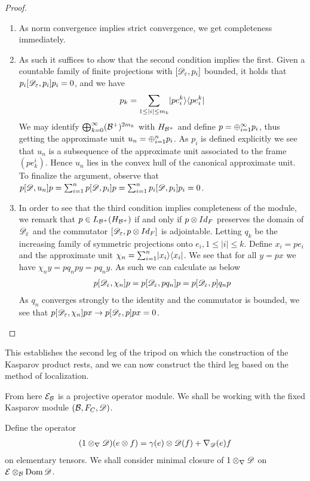 \begin{proof}
\begin{enumerate}
	\item As norm convergence implies strict convergence, we get completeness immediately. 
	\item As such it suffices to show that the second condition implies the first. 
	Given a countable family of finite projections with $[\mathscr{D}_\varepsilon,p_i]$ bounded, it holds that $p_i[\mathscr{D}_\varepsilon,p_i]p_i=0$, and we have
	\begin{align*}
		p_k=\sum_{1\leq |i|\leq m_k} \lvert pe_i^k \rangle\langle pe_i^k \rvert
	\end{align*}
	We may identify $\bigoplus_{k=0}^\infty (\mathcal{B}^+)^{2m_k}$ with $H_{\mathcal{B}^+}$ and define $p=\oplus_{i=1}^\infty p_i$, thus getting the approximate unit $u_n=\oplus_{i=1}^n p_i$. As $p_i$ is defined explicitly we see that $u_n$ is a subsequence of the approximate unit associated to the frame $(pe_k^i)$. Hence $u_n$ lies in the convex hull of the canonical approximate unit.  
	To finalize the argument, observe that $p[\mathscr{D},u_n]p=\sum_{i=1}^n p[\mathscr{D},p_i]p=\sum_{i=1}^n p_i [\mathscr{D},p_i]p_i=0$. 
	\item In order to see that the third condition implies completeness of the module, we remark that $p\in L_{\mathcal{B}^+}(H_{\mathcal{B}^+})$ if and only if $p \otimes Id_F$ preserves the domain of $\mathscr{D}_\varepsilon$ and the commutator $[\mathscr{D}_\varepsilon, p\otimes Id_F]$ is adjointable.
	Letting $q_k$ be the increasing family of symmetric projections onto $e_i,1\leq |i|\leq k$. Define $x_i=pe_i$ and the approximate unit $\chi_n=\sum_{i=1}^n \lvert x_i \rangle\langle x_i \rvert$. 
	We see that for all $y=px$ we have $\chi_n y=pq_npy=pq_n y$. As such we can calculate as below
	\begin{align*}
		p[\mathscr{D}_\varepsilon,\chi_n]p=p[\mathscr{D}_\varepsilon,pq_n]p=p[\mathscr{D}_\varepsilon,p]q_np
	\end{align*}
	As $q_n$ converges strongly to the identity and the commutator is bounded, we see that $p[\mathscr{D}_\varepsilon,\chi_n]p x\to p[\mathscr{D}_\varepsilon,p]px=0$. 
	\end{enumerate}
\end{proof}
This establishes the second leg of the tripod on which the construction of the Kasparov product rests, and we can now construct the third leg based on the method of localization.
\begin{assumption}
	From here $\mathcal{E}_{\mathcal{B}}$ is a projective operator module. We shall be working with the fixed Kasparov module $(\mathcal{B},F_C,\mathscr{D})$. 
\end{assumption}
\begin{definition}
	Define the operator 
	\begin{align*}
		(1\otimes_\nabla \mathscr{D})(e\otimes f)=\gamma(e)\otimes \mathscr{D}(f)+\nabla_{\mathscr{D}}(e)f
	\end{align*}
	on elementary tensors. We shall consider minimal closure of $1\otimes_\nabla \mathscr{D}$ on $\mathcal{E}\otimes_{\mathcal{B}} \operatorname{Dom} \mathscr{D}$.
\end{definition}
